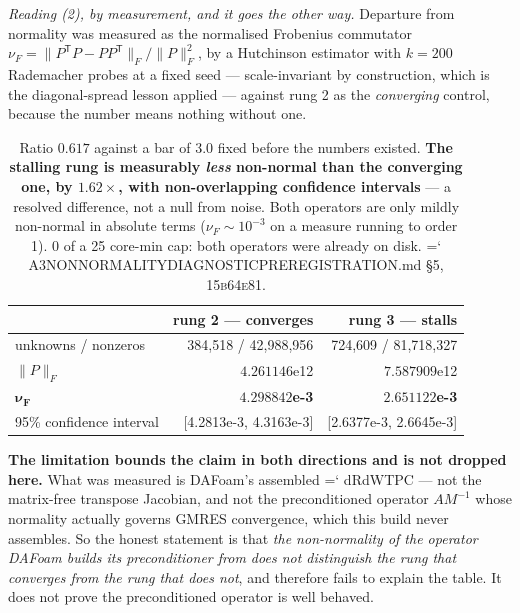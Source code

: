\documentclass[11pt,a4paper]{article}
\newcommand{\artifact}[1]{{\small\ttfamily\hyphenchar\font=`\-\relax
  \def\_{\textunderscore\allowbreak}#1}}
\newcommand{\commit}[1]{\textsc{\small #1}}
\begin{document}
\emph{Reading (2), by measurement, and it goes the other way.} Departure from normality was
measured as the normalised Frobenius commutator
\(\nu_F = \lVert P^{\mathsf T}P - PP^{\mathsf T}\rVert_F / \lVert P\rVert_F^2\), by a Hutchinson
estimator with \(k=200\) Rademacher probes at a fixed seed --- scale-invariant by construction,
which is the diagonal-spread lesson applied --- against rung 2 as the \emph{converging} control,
because the number means nothing without one.

\begin{table}[htbp]
\centering\footnotesize
\begin{tabular}{@{}lrr@{}}
\toprule
 & rung 2 --- \textbf{converges} & rung 3 --- \textbf{stalls} \\
\midrule
unknowns / nonzeros & 384{,}518 / 42{,}988{,}956 & 724{,}609 / 81{,}718{,}327 \\
\(\lVert P\rVert_F\) & \(4.261146\)e12 & \(7.587909\)e12 \\
\(\boldsymbol{\nu_F}\) & \(\mathbf{4.298842}\)\textbf{e-3} & \(\mathbf{2.651122}\)\textbf{e-3} \\
95\% confidence interval & [4.2813e-3, 4.3163e-3] & [2.6377e-3, 2.6645e-3] \\
\bottomrule
\end{tabular}
\caption{Ratio \(0.617\) against a bar of \(3.0\) fixed before the numbers existed.
\textbf{The stalling rung is measurably \emph{less} non-normal than the converging one, by
\(1.62\times\), with non-overlapping confidence intervals} --- a resolved difference, not a null
from noise. Both operators are only mildly non-normal in absolute terms
(\(\nu_F\sim10^{-3}\) on a measure running to order 1). 0 of a 25 core-min cap: both operators
were already on disk. \artifact{A3\_NONNORMALITY\_DIAGNOSTIC\_\allowbreak PREREGISTRATION.md} \S5,
\commit{15b64e81}.}
\label{tab:nonnormal}
\end{table}

\textbf{The limitation bounds the claim in both directions and is not dropped here.} What was
measured is DAFoam's assembled \artifact{dRdWTPC} --- not the matrix-free transpose Jacobian, and
not the preconditioned operator \(AM^{-1}\) whose normality actually governs GMRES convergence,
which this build never assembles. So the honest statement is that \emph{the non-normality of the
operator DAFoam builds its preconditioner from does not distinguish the rung that converges from
the rung that does not}, and therefore fails to explain the table. It does not prove the
preconditioned operator is well behaved.
\end{document}
